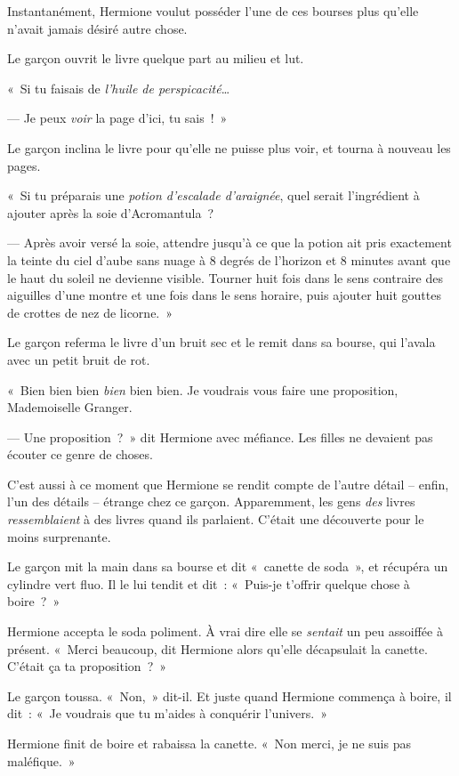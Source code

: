 Instantanément, Hermione voulut posséder l'une de ces bourses plus qu'elle n'avait jamais désiré autre chose.

Le garçon ouvrit le livre quelque part au milieu et lut.

«~Si tu faisais de \emph{l'huile de perspicacité}…

--- Je peux \emph{voir} la page d'ici, tu sais~!~»

Le garçon inclina le livre pour qu'elle ne puisse plus voir, et tourna à nouveau les pages.

«~Si tu préparais une \emph{potion d'escalade d'araignée}, quel serait l'ingrédient à ajouter après la soie d'Acromantula~?

--- Après avoir versé la soie, attendre jusqu'à ce que la potion ait pris exactement la teinte du ciel d'aube sans nuage à 8 degrés de l'horizon et 8 minutes avant que le haut du soleil ne devienne visible. Tourner huit fois dans le sens contraire des aiguilles d'une montre et une fois dans le sens horaire, puis ajouter huit gouttes de crottes de nez de licorne.~»

Le garçon referma le livre d'un bruit sec et le remit dans sa bourse, qui l'avala avec un petit bruit de rot.

«~Bien bien bien \emph{bien} bien bien. Je voudrais vous faire une proposition, Mademoiselle Granger.

--- Une proposition~?~» dit Hermione avec méfiance. Les filles ne devaient pas écouter ce genre de choses.

C'est aussi à ce moment que Hermione se rendit compte de l'autre détail -- enfin, l'un des détails -- étrange chez ce garçon. Apparemment, les gens \emph{des} livres \emph{ressemblaient} à des livres quand ils parlaient. C'était une découverte pour le moins surprenante.

Le garçon mit la main dans sa bourse et dit «~canette de soda~», et récupéra un cylindre vert fluo. Il le lui tendit et dit~: «~Puis-je t'offrir quelque chose à boire~?~»

Hermione accepta le soda poliment. À vrai dire elle se \emph{sentait} un peu assoiffée à présent. «~Merci beaucoup, dit Hermione alors qu'elle décapsulait la canette. C'était ça ta proposition~?~»

Le garçon toussa. «~Non,~» dit-il. Et juste quand Hermione commença à boire, il dit~: «~Je voudrais que tu m'aides à conquérir l'univers.~»

Hermione finit de boire et rabaissa la canette. «~Non merci, je ne suis pas maléfique.~»

